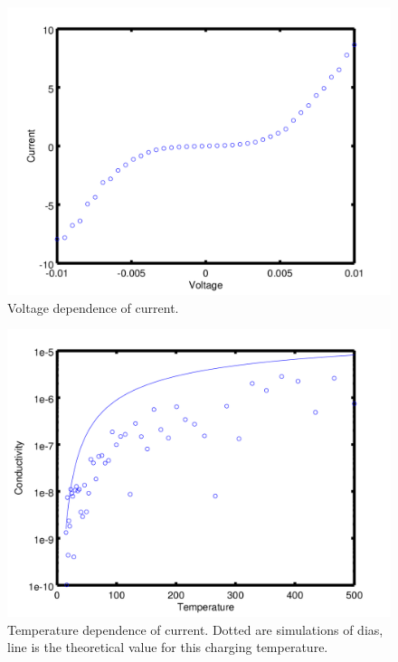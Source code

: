\begin{figure}[htbp]
\begin{center}
\includegraphics[scale=.50]{VvJ.png}
\caption{Voltage dependence of current.}
\label{JvsV}
\end{center}
\end{figure}

\begin{figure}[htbp]
\begin{center}
\includegraphics[scale=.50]{jvtFit.png}
\caption{Temperature dependence of current. Dotted are simulations of {\sc dias}, line is the theoretical value for this charging temperature.}
\label{TvJ}
\end{center}
\end{figure}

